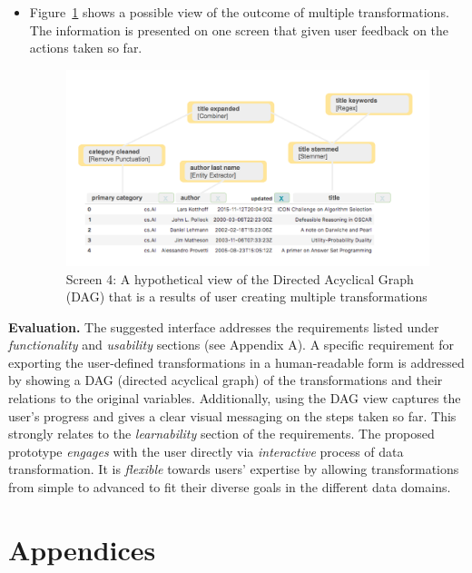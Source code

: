 \documentclass[12pt,letterpaper]{article}
\begin{document}
\begin{itemize}
    \item Figure~\ref{fig::5} shows a possible view of the outcome of multiple transformations. The information is presented on one screen that given user feedback on the actions taken so far.

\begin{figure}[h]
\centering
\includegraphics[scale=.3]{figures/m3/wireframe-screen5.png}
\caption{Screen 4: A hypothetical view of the Directed Acyclical Graph (DAG) that is a results of user creating multiple transformations}
\label{fig::5}
\end{figure}

\end{itemize}

\textbf{Evaluation.} The suggested interface addresses the requirements listed under \textit{functionality} and \textit{usability} sections (see Appendix A). A specific requirement for exporting the user-defined transformations in a human-readable form is addressed by showing a DAG (directed acyclical graph) of the transformations and their relations to the original variables.  Additionally, using the DAG view captures the user's progress and gives a clear visual messaging on the steps taken so far. This strongly relates to the \textit{learnability} section of the requirements. The proposed prototype \textit{engages} with the user directly via \textit{interactive} process of data transformation. It is \textit{flexible} towards users' expertise by allowing transformations from simple to advanced to fit their diverse goals in the different data domains. 


 


\newpage
\section*{Appendices}
\end{document}
